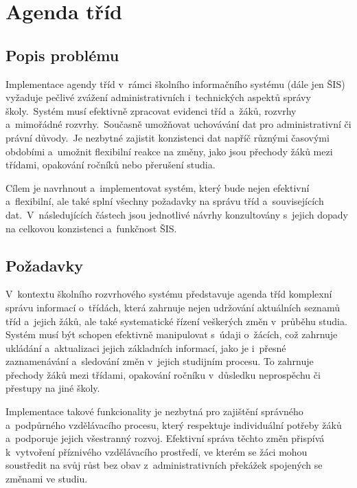 \chapter{Agenda tříd}
\section{Popis problému}
Implementace agendy tříd v~rámci školního informačního systému (dále jen ŠIS) vyžaduje pečlivé zvážení administrativních i~technických aspektů správy školy.~Systém musí efektivně zpracovat evidenci tříd a~žáků, rozvrhy a~mimořádné rozvrhy.~Současně umožňovat uchovávání dat pro administrativní či právní důvody.~Je nezbytné zajistit konzistenci dat napříč různými časovými obdobími a~umožnit flexibilní reakce na změny, jako jsou přechody žáků mezi třídami, opakování ročníků nebo přerušení studia.

Cílem je navrhnout a~implementovat systém, který bude nejen efektivní a~flexibilní, ale také splní všechny požadavky na správu tříd a~souvisejících dat.~V~následujících částech jsou jednotlivé návrhy konzultovány s~jejich dopady na celkovou konzistenci a~funkčnost ŠIS.

\section{Požadavky}
V~kontextu školního rozvrhového systému představuje agenda tříd komplexní správu informací o~třídách, která zahrnuje nejen udržování aktuálních seznamů tříd a~jejich žáků, ale také systematické řízení veškerých změn v~průběhu studia. Systém musí být schopen efektivně manipulovat s~údaji o~žácích, což zahrnuje ukládání a~aktualizaci jejich základních informací, jako je i~přesné zaznamenávání a~sledování změn v~jejich studijním procesu. To zahrnuje přechody žáků mezi třídami, opakování ročníku v~důsledku neprospěchu či přestupy na jiné školy.

Implementace takové funkcionality je nezbytná pro zajištění správného a~podpůrného vzdělávacího procesu, který respektuje individuální potřeby žáků a~podporuje jejich všestranný rozvoj. Efektivní správa těchto změn přispívá k~vytvoření příznivého vzdělávacího prostředí, ve kterém se žáci mohou soustředit na svůj růst bez obav z~administrativních překážek spojených se změnami ve studiu.

